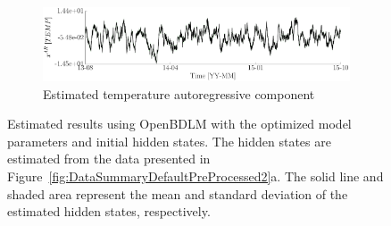 \begin{figure}[h!]
\begin{subfigure}{\linewidth}
\end{subfigure}
\begin{subfigure}{\linewidth}\centering
\includegraphics[width=0.9\linewidth]{./docfigs/Example_DISPTEMPSIM/optim_param_optim_initialhiddenstate/TEMP_AR_6.pdf} 
\caption{Estimated temperature autoregressive component}
\end{subfigure}
\caption{Estimated results using OpenBDLM with the optimized model parameters and initial hidden states. The hidden states are estimated from the data presented in Figure~\ref{fig:DataSummaryDefaultPreProcessed2}a. The solid line and shaded area represent the mean and standard deviation of the estimated hidden states, respectively.}
\label{fig:DISPTEMPSIMOptimizedOptimizedExample2}
\end{figure}